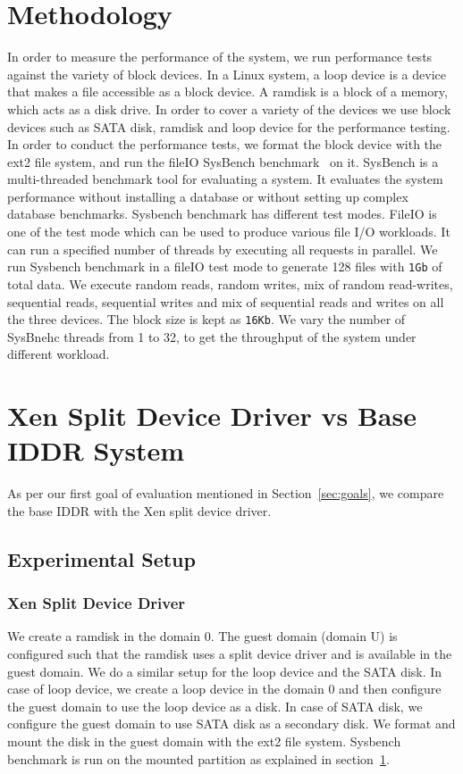 \section{Methodology}
\label{sec:methodology}
In order to measure the performance of the system, we run performance tests against the variety of block devices. In a Linux system, a loop device is a device that makes a file accessible as a block device. A ramdisk is a block of a memory, which acts as a disk drive. In order to cover a variety of the devices we use block devices such as SATA disk, ramdisk and loop device for the performance testing.
\\[3mm]
In order to conduct the performance tests, we format the block device with the ext2 file system, and run the fileIO SysBench benchmark~\cite{sysbench} on it. SysBench is a multi-threaded benchmark tool for evaluating a system. It evaluates the system performance without installing a database or without setting up complex database benchmarks. Sysbench benchmark has different test modes. FileIO is one of the test mode which can be used to produce various file I/O workloads. It can run a specified number of threads by executing all requests in parallel. We run Sysbench benchmark in a fileIO test mode to generate 128 files with \texttt{1Gb} of total data. We execute random reads, random writes, mix of random read-writes, sequential reads, sequential writes and mix of sequential reads and writes on all the three devices. The block size is kept as \texttt{16Kb}. We vary the number of SysBnehc threads from 1 to 32, to get the throughput of the system under different workload. 

\section{Xen Split Device Driver vs Base IDDR System}
As per our first goal of evaluation mentioned in Section~\ref{sec:goals}, we compare the base IDDR with the Xen split device driver. 

\subsection*{Experimental Setup}

\subsubsection*{Xen Split Device Driver}
We create a ramdisk in the domain 0. The guest domain (domain U) is configured such that the ramdisk uses a split device driver and is available in the guest domain. We do a similar setup for the loop device and the SATA disk. In case of loop device, we create a loop device in the domain 0 and then configure the guest domain to use the loop device as a disk. In case of SATA disk, we configure the guest domain to use SATA disk as a secondary disk. We format and mount the disk in the guest domain with the ext2 file system. Sysbench benchmark is run on the mounted partition as explained in section~\ref{sec:methodology}.

